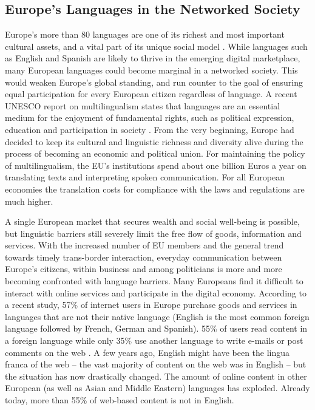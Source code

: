 \documentclass[10pt, plain]{../../metanetpaper}
\begin{document}
\clearpage



\begin{multicols}{2}

\subsection{Europe's Languages in the Networked Society}
\label{sec:status-europes-languages}

Europe’s more than 80 languages are one of its richest and most important cultural assets, and a vital part of its unique social model \cite{EC2}. While languages such as English and Spanish are likely to thrive in the emerging digital marketplace, many European languages could become marginal in a networked society. This would weaken Europe’s global standing, and run counter to the goal of ensuring equal participation for every European citizen regardless of language. A recent UNESCO report on multilingualism states that languages are an essential medium for the enjoyment of fundamental rights, such as political expression, education and participation in society \cite{Unesco1}. From the very beginning, Europe had decided to keep its cultural and linguistic richness and diversity alive during the process of becoming an economic and political union. For maintaining the policy of multilingualism, the EU’s institutions spend about one billion Euros a year on translating texts and interpreting spoken communication. For all European economies the translation costs for compliance with the laws and regulations are much higher.

A single European market that secures wealth and social well-being is possible, but linguistic barriers still severely limit the free flow of goods, information and services. With the increased number of EU members and the general trend towards timely trans-border interaction, everyday communication between Europe’s citizens, within business and among politicians is more and more becoming confronted with language barriers. Many Europeans find it difficult to interact with online services and participate in the digital economy. According to a recent study, 57\% of internet users in Europe purchase goods and services in languages that are not their native language (English is the most common foreign language followed by French, German and Spanish). 55\% of users read content in a foreign language while only 35\% use another language to write e-mails or post comments on the web \cite{EC1}. A few years ago, English might have been the lingua franca of the web -- the vast majority of content on the web was in English -- but the situation has now drastically changed. The amount of online content in other European (as well as Asian and Middle Eastern) languages has exploded. Already today, more than 55\% of web-based content is not in English.


\end{multicols}
\end{document}
